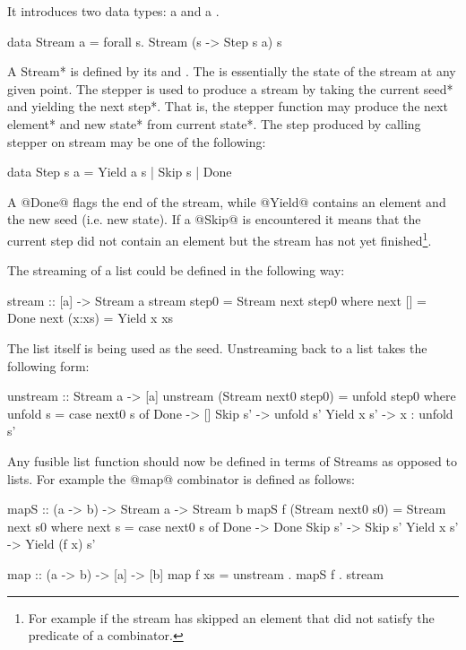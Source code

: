 \documentclass[preamble.tex]{subfiles}
\begin{document}
It introduces two data types: a  and a .

\begin{hscode}
data Stream a = forall s. Stream (s -> Step s a) s
\end{hscode}


A \*Stream* is defined by its  and . The  is essentially the state of the stream at any given point. The stepper is used to produce a stream by taking the current \*seed* and yielding the \*next step*. That is, the stepper function may produce the next \*element* and \*new state* from \*current state*. The step produced by calling stepper on stream may be one of the following:


\begin{hscode}
data Step s a = Yield a s
              | Skip s
              | Done
\end{hscode}


A @Done@ flags the end of the stream, while @Yield@ contains an element and the new seed (i.e. new state). If a @Skip@ is encountered it means that the current step did not contain an element but the stream has not yet finished\footnote{For example if the stream has skipped an element that did not satisfy the predicate of a  combinator.}.

The streaming of a list could be defined in the following way:

\begin{hscode}
stream :: [a] -> Stream a
stream step0 = Stream next step0
  where next []     = Done
        next (x:xs) = Yield x xs
\end{hscode}


The list itself is being used as the seed. Unstreaming back to a list takes the following form:


\begin{hscode}
unstream :: Stream a -> [a]
unstream (Stream next0 step0) = unfold step0
  where unfold s = case next0 s of
          Done       -> []
          Skip s'    -> unfold s'
          Yield x s' -> x : unfold s'
\end{hscode}


Any fusible list function should now be defined in terms of Streams as opposed to lists. For example the @map@ combinator is defined as follows:


\begin{hscode}
mapS :: (a -> b) -> Stream a -> Stream b
mapS f (Stream next0 s0) = Stream next s0
  where next s = case next0 s of
    Done       -> Done
    Skip    s' -> Skip        s'
    Yield x s' -> Yield (f x) s'

map :: (a -> b) -> [a] -> [b]
map f xs = unstream . mapS f . stream
\end{hscode}
\end{document}
